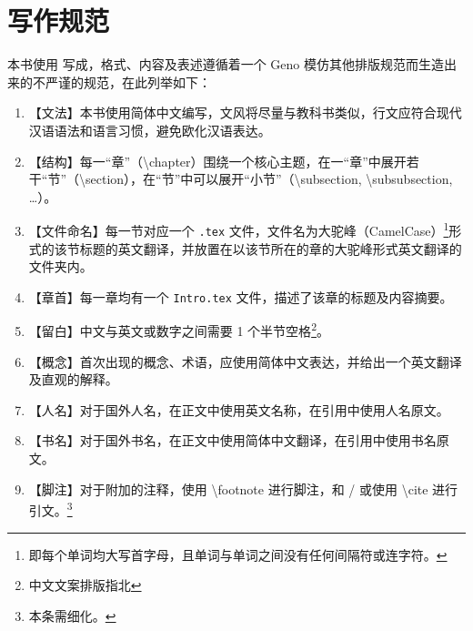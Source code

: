 \chapter*{写作规范}\label{ch:Preface/WritingGuideline}
    本书使用  写成，格式、内容及表述遵循着一个 Geno 模仿其他排版规范而生造出来的不严谨的规范，在此列举如下：

    \begin{enumerate}
        \item 【文法】本书使用简体中文编写，文风将尽量与教科书类似，行文应符合现代汉语语法和语言习惯，避免欧化汉语表达。
        \item 【结构】每一“章”（\textbackslash chapter）围绕一个核心主题，在一“章”中展开若干“节”（\textbackslash section），在“节”中可以展开“小节”（\textbackslash subsection, \textbackslash subsubsection, \ldots）。
        \item 【文件命名】每一节对应一个 \texttt{.tex} 文件，文件名为大驼峰（CamelCase）\footnote{即每个单词均大写首字母，且单词与单词之间没有任何间隔符或连字符。}形式的该节标题的英文翻译，并放置在以该节所在的章的大驼峰形式英文翻译的文件夹内。
        \item 【章首】每一章均有一个 \texttt{Intro.tex} 文件，描述了该章的标题及内容摘要。
        \item 【留白】中文与英文或数字之间需要 1 个半节空格\footnote{中文文案排版指北\cite{sparanoid-cwg}}。
        \item 【概念】首次出现的概念、术语，应使用简体中文表达，并给出一个英文翻译及直观的解释。
        \item 【人名】对于国外人名，在正文中使用英文名称，在引用中使用人名原文。
        \item 【书名】对于国外书名，在正文中使用简体中文翻译，在引用中使用书名原文。
        \item 【脚注】对于附加的注释，使用 \textbackslash footnote 进行脚注，和 / 或使用 \textbackslash cite 进行引文。\footnote{本条需细化。}
    \end{enumerate}

